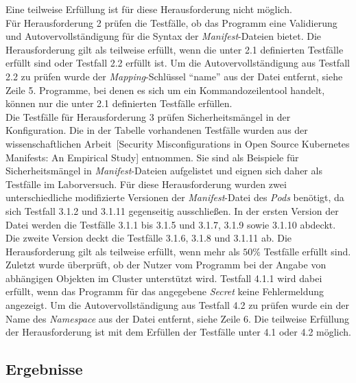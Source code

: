 Eine teilweise Erfüllung ist für diese Herausforderung nicht möglich.
\\
Für Herausforderung 2 prüfen die Testfälle, ob das Programm eine Validierung und Autovervollständigung für die Syntax der \textit{Manifest}-Dateien
bietet. Die Herausforderung gilt als teilweise erfüllt, wenn die unter 2.1 definierten Testfälle erfüllt sind oder Testfall 2.2 erfüllt ist.
Um die Autovervollständigung aus Testfall 2.2 zu prüfen wurde der \textit{Mapping}-Schlüssel ``name'' aus der Datei entfernt, siehe Zeile 5.
Programme, bei denen es sich um ein Kommandozeilentool handelt, können nur die unter 2.1 definierten Testfälle erfüllen.
\\
Die Testfälle für Herausforderung 3 prüfen Sicherheitsmängel in der Konfiguration. Die in der Tabelle vorhandenen Testfälle wurden
aus der wissenschaftlichen Arbeit~\cite{10.1145/3579639}[Security Misconfigurations in Open Source Kubernetes Manifests: An Empirical Study]
entnommen. Sie sind als Beispiele für Sicherheitsmängel in \textit{Manifest}-Dateien aufgelistet und eignen sich daher als Testfälle im Laborversuch.
Für diese Herausforderung wurden zwei unterschiedliche modifizierte Versionen der \textit{Manifest}-Datei des \textit{Pods} benötigt,
da sich Testfall 3.1.2 und 3.1.11 gegenseitig ausschließen.
In der ersten Version der Datei werden die Testfälle 3.1.1 bis 3.1.5 und 3.1.7, 3.1.9 sowie 3.1.10 abdeckt.
Die zweite Version deckt die Testfälle 3.1.6, 3.1.8 und 3.1.11 ab.
Die Herausforderung gilt als teilweise erfüllt, wenn mehr als $50\%$ Testfälle erfüllt sind.
\\
Zuletzt wurde überprüft, ob der Nutzer vom Programm bei der Angabe von abhängigen Objekten im Cluster unterstützt wird.
Testfall 4.1.1 wird dabei erfüllt, wenn das Programm für das angegebene \textit{Secret} keine Fehlermeldung angezeigt.
Um die Autovervollständigung aus Testfall 4.2 zu prüfen wurde ein der Name des \textit{Namespace} aus der Datei entfernt, siehe Zeile 6.
Die teilweise Erfüllung der Herausforderung ist mit dem Erfüllen der Testfälle unter 4.1 oder 4.2 möglich.

\subsection{Ergebnisse}


